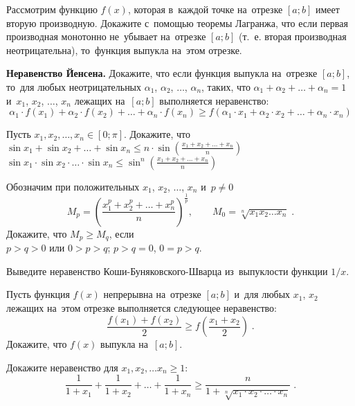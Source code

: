 \begin{problems}

\item
Рассмотрим функцию $f(x)$, которая в~каждой точке на~отрезке $[a; b]$ имеет
вторую производную.
Докажите с~помощью теоремы Лагранжа, что если первая производная монотонно
не~убывает на~отрезке $[a; b]$ (т.~е. вторая производная неотрицательна),
то~функция выпукла на~этом отрезке.

\item\textbf{Неравенство Йенсена.}
Докажите, что если функция выпукла на~отрезке $[a; b]$, то~для любых
неотрицательных $\alpha_1$, $\alpha_2$, $\ldots$, $\alpha_n$, таких, что
$\alpha_1 + \alpha_2 + \ldots + \alpha_n = 1$ и~$x_1$, $x_2$, $\ldots$, $x_n$
лежащих на~$[a; b]$ выполняется неравенство:
\[
    \alpha_1 \cdot f(x_1) + \alpha_2 \cdot f(x_2)
    + \ldots +
    \alpha_n \cdot f(x_n)
\geq
    f(\alpha_1 \cdot x_1 + \alpha_2 \cdot x_2 + \ldots + \alpha_n \cdot x_n)
\]

\item
Пусть $x_1, x_2, \ldots, x_n \in [0;\pi]$.
Докажите, что
\\
\sbp
\(
    \sin x_1 + \sin x_2 + \ldots + \sin x_n
\leq
    n \cdot \sin \left(
        \frac{x_1 + x_2 + \ldots + x_n}{n}
    \right)
\)
\\
\sbp
\(
    \sin x_1 \cdot \sin x_2 \cdot \ldots \cdot \sin x_n
\leq
    \sin^n \left(
        \frac{x_1 + x_2 + \ldots + x_n}{n}
    \right)
\)

\item
Обозначим при положительных $x_1$, $x_2$, $\ldots$, $x_n$ и~$p \neq 0$
\[
    M_p
=
    \left(
        \frac{x_1^p + x_2^p + \ldots + x_n^p}{n}
    \right)^{\frac{1}{p}}
,\qquad
    M_0
=
    \sqrt[n]{x_1 x_2 \ldots x_n}
\;.\]
Докажите, что $M_p \geq M_q$, если
\\
\sbp $p > q > 0$ или $0 > p > q$;
\qquad
\sbp $p > q = 0$, $0 = p > q$.


\item
Выведите неравенство Коши-Буняковского-Шварца из~выпуклости функции $1/x$.

\item
Пусть функция $f(x)$ непрерывна на~отрезке $[a; b]$ и~для любых $x_1$, $x_2$
лежащих на~этом отрезке выполняется следующее неравенство:
\[
    \frac{f(x_1) + f(x_2)}{2}
\geq
    f\left(\frac{x_1 + x_2}{2}\right)
\;.\]
Докажите, что $f(x)$ выпукла на~$[a; b]$.

\item
Докажите неравенство для $x_1, x_2, \ldots x_n \geq 1$:
\[
    \frac{1}{1 + x_1} + \frac{1}{1 + x_2} + \ldots + \frac{1}{1 + x_n}
\geq
    \frac{n}{1 + \sqrt[n]{x_1 \cdot x_2 \cdot \ldots \cdot x_n}}
\;.\]

\end{problems}


